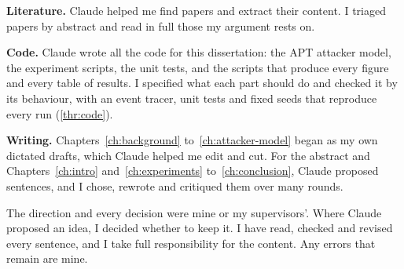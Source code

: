 \documentclass{cshonours}
\begin{document}
\textbf{Literature.} Claude helped me find papers and extract their content. I
triaged papers by abstract and read in full those my argument rests on.

\textbf{Code.} Claude wrote all the code for this dissertation: the
APT attacker model, the experiment scripts, the unit tests, and the scripts
that produce every figure and every table of results. I specified what each part should do and
checked it by its behaviour, with an event tracer, unit tests and fixed seeds
that reproduce every run (\ref{thr:code}).

\textbf{Writing.} Chapters~\ref{ch:background} to~\ref{ch:attacker-model}
began as my own dictated drafts, which Claude helped me edit and cut. For the
abstract and Chapters~\ref{ch:intro} and~\ref{ch:experiments}
to~\ref{ch:conclusion}, Claude proposed sentences, and I chose, rewrote and
critiqued them over many rounds.

The direction and every decision were mine or my supervisors'. Where Claude
proposed an idea, I decided whether to keep it. I have read, checked and revised every sentence, and I take full responsibility for the
content. Any errors that remain are mine.


\appendix



\end{document}
